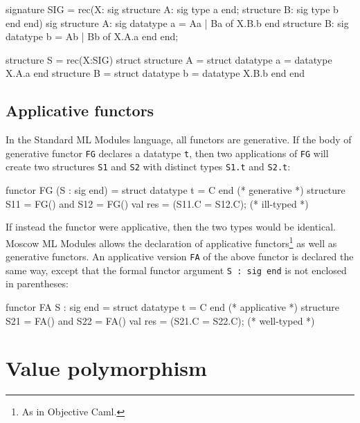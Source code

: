 \documentclass[fleqn,a4paper]{article}
\begin{document}
\begin{program}
signature SIG = rec(X: sig structure A: sig type a end;
                           structure B: sig type b end
                       end)
                   sig structure A: sig datatype a = Aa | Ba of X.B.b end
                       structure B: sig datatype b = Ab | Bb of X.A.a end
                   end;

structure S = rec(X:SIG)
    struct structure A = struct datatype a = datatype X.A.a end
           structure B = struct datatype b = datatype X.B.b end
    end
\end{program}


\subsection{Applicative functors}
\label{sec-applicative-functors}

In the Standard ML Modules language, all functors are generative.  If
the body of generative functor \texttt{FG} declares a datatype
\texttt{t}, then two applications of \texttt{FG} will create two
structures \texttt{S1} and \texttt{S2} with distinct types
\texttt{S1.t} and \texttt{S2.t}:

\begin{program}
functor FG (S : sig end) = struct datatype t = C end    (* generative  *)
structure S11 = FG() and S12 = FG()
val res = (S11.C = S12.C);                              (* ill-typed   *)
\end{program}

\noindent 
If instead the functor were applicative, then the two types would be
identical.  Moscow ML Modules allows the declaration of applicative
functors\footnote{As in Objective Caml.} as well as generative
functors.  An applicative version \texttt{FA} of the above functor is
declared the same way, except that the formal functor argument
\texttt{S :\ sig end} is not enclosed in parentheses:

\begin{program}
functor FA S : sig end = struct datatype t = C end      (* applicative *)
structure S21 = FA() and S22 = FA()
val res = (S21.C = S22.C);                              (* well-typed  *)
\end{program}


\newpage

\section{Value polymorphism}
\label{sec-valuepoly}
\end{document}
